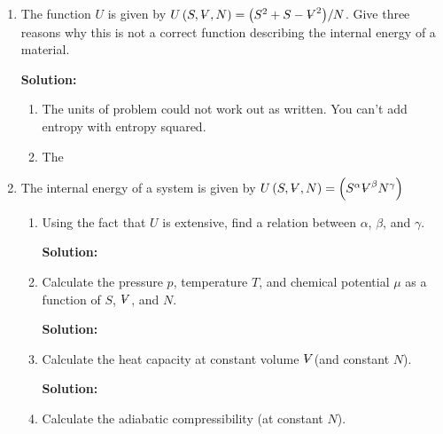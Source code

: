 \documentclass[10pt]{article}
\newenvironment{Solution}
    {\textbf{Solution:}
    
    \vspace{5mm}
    \begin{tcolorbox}
    }
    {
    \end{tcolorbox}
    \vspace{5mm}
    }
\newcommand{\vol}{{\ooalign{\hfil$V$\hfil\cr\kern0.08em--\hfil\cr}}}
\begin{document}

\begin{enumerate}



\item The function  $U$ is given by $U\left(S,\vol,N\right) = {\left(S^2+S-\vol^2\right)}/{N}$. Give three reasons why this is not a correct function describing the internal energy of a material.


\begin{Solution}
\begin{enumerate}
    \item The units of problem could not work out as written. You can't add entropy with entropy squared.
    \item The 
\end{enumerate}
\end{Solution}

\item The internal energy of a system is given by  $U\left(S,\vol,N\right) = {\left(S^\alpha \vol^\beta N^\gamma \right)}$
\begin{enumerate}
    \item Using the fact that $U$ is extensive, find a relation between $\alpha$, $\beta$, and $\gamma$.
    
    \begin{Solution}


    \end{Solution}
    \item Calculate the pressure $p$, temperature 
    $T$, and chemical potential $\mu$ as a function of $S$, $\vol$, and $N$.
    
    \begin{Solution}


    \end{Solution}


    \item Calculate the heat capacity at constant volume $\vol$(and constant $N$).
    
    \begin{Solution}    
    
    
    \end{Solution}

    \item Calculate the adiabatic compressibility (at constant $N$).
    

\end{enumerate}
\end{enumerate}
\end{document}
